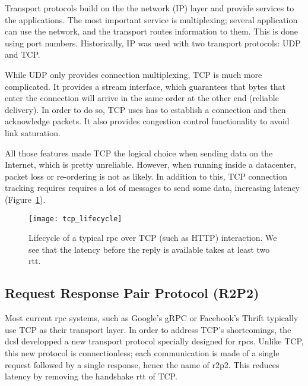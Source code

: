 Transport protocols build on the the network (IP) layer and provide services to the applications.
The most important service is multiplexing; several application can use the network, and the transport routes information to them.
This is done using port numbers.
Historically, IP was used with two transport protocols: UDP and TCP.

While UDP only provides connection multiplexing, TCP is much more complicated.
It provides a stream interface, which guarantees that bytes that enter the connection will arrive in the same order at the other end (reliable delivery).
In order to do so, TCP uses has to establish a connection and then acknowledge packets.
It also provides congestion control functionality to avoid link saturation.

All those features made TCP the logical choice when sending data on the Internet, which is pretty unreliable.
However, when running inside a datacenter, packet loss or re-ordering is not as likely.
In addition to this, TCP connection tracking requires requires a lot of messages to send some data, increasing latency (Figure~\ref{fig:tcp_lifecycle}).

%
%
%
%


\begin{figure}[h]
    \centering
    \texttt{[image: tcp\_lifecycle]}
    \caption{Lifecycle of a typical \gls{rpc} over TCP (such as HTTP) interaction.
        We see that the latency before the reply is available takes at least two \gls{rtt}.
    \label{fig:tcp_lifecycle}
    }
\end{figure}


\subsection{Request Response Pair Protocol (R2P2)}

Most current \gls{rpc} systems, such as Google's gRPC\cite{grpc} or Facebook's Thrift\cite{thrift} typically use TCP as their transport layer.
In order to address TCP's shortcomings, the \gls{dcsl} developped a new transport protocol specially designed for \glspl{rpc}.
Unlike TCP, this new protocol is connectionless; each communication is made of a single request followed by a single response, hence the name of \gls{r2p2}.
This reduces latency by removing the handshake \gls{rtt} of TCP.

